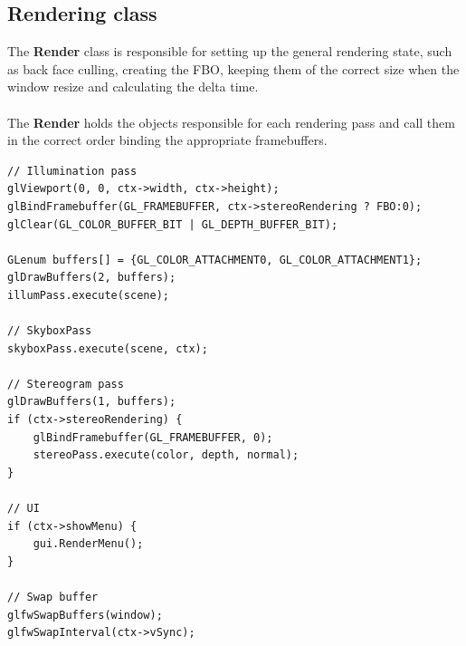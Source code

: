 \documentclass[12pt, a4paper]{article}
\begin{document}
\subsection{Rendering class}
The \textbf{Render} class is responsible for setting up the general rendering state, such as back face culling, creating
the FBO, keeping them of the correct size when the window resize and calculating the delta time.\\\\
The \textbf{Render} holds the objects responsible for each rendering pass and call them in the correct order binding the appropriate
framebuffers.
\begin{lstlisting}[caption={Main rendering loop},captionpos=b]
// Illumination pass
glViewport(0, 0, ctx->width, ctx->height);
glBindFramebuffer(GL_FRAMEBUFFER, ctx->stereoRendering ? FBO:0);
glClear(GL_COLOR_BUFFER_BIT | GL_DEPTH_BUFFER_BIT);

GLenum buffers[] = {GL_COLOR_ATTACHMENT0, GL_COLOR_ATTACHMENT1};
glDrawBuffers(2, buffers);
illumPass.execute(scene);

// SkyboxPass
skyboxPass.execute(scene, ctx);

// Stereogram pass
glDrawBuffers(1, buffers);
if (ctx->stereoRendering) {
    glBindFramebuffer(GL_FRAMEBUFFER, 0);
    stereoPass.execute(color, depth, normal);
}

// UI
if (ctx->showMenu) {
    gui.RenderMenu();
}

// Swap buffer
glfwSwapBuffers(window);
glfwSwapInterval(ctx->vSync);
\end{lstlisting}
\end{document}
